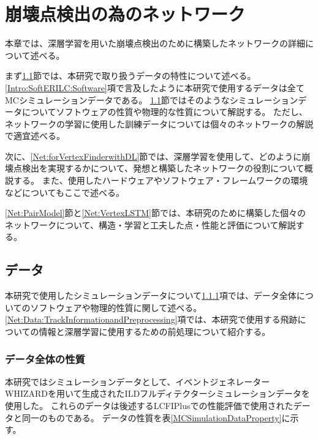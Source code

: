 
\chapter{崩壊点検出の為のネットワーク} \label{chap:Networks}

本章では、深層学習を用いた崩壊点検出のために構築したネットワークの詳細について述べる。

まず\ref{Net:Data}節では、本研究で取り扱うデータの特性について述べる。
\ref{Intro:SoftERILC:Software}項で言及したように本研究で使用するデータは全てMCシミュレーションデータである。
\ref{Net:Data}節ではそのようなシミュレーションデータについてソフトウェアの性質や物理的な性質について解説する。
ただし、ネットワークの学習に使用した訓練データについては個々のネットワークの解説で適宜述べる。

次に、\ref{Net:forVertexFinderwithDL}節では、深層学習を使用して、どのように崩壊点検出を実現するかについて、発想と構築したネットワークの役割について概説する。
また、使用したハードウェアやソフトウェア・フレームワークの環境などについてもここで述べる。

\ref{Net:PairModel}節と\ref{Net:VertexLSTM}節では、本研究のために構築した個々のネットワークについて、構造・学習と工夫した点・性能と評価について解説する。


\section{データ} \label{Net:Data}

本研究で使用したシミュレーションデータについて\ref{Net:Data:DataProperty}項では、データ全体についてのソフトウェアや物理的性質に関して述べる。
\ref{Net:Data:TrackInformationandPreprocessing}項では、本研究で使用する飛跡についての情報と深層学習に使用するための前処理について紹介する。

\subsection{データ全体の性質} \label{Net:Data:DataProperty}

本研究ではシミュレーションデータとして、イベントジェネレーター　WHIZARD\cite{WHIZARDpaper}を用いて生成されたILDフルディテクターシミュレーションデータを使用した。
これらのデータは後述するLCFIPlusでの性能評価\cite{LCFIPlusPaper}で使用されたデータと同一のものである。
データの性質を表\ref{MCSimulationDataProperty}に示す。

